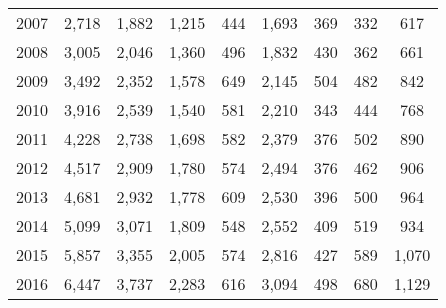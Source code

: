 \begin{table}[htbp]
\begin{tabular}{l*{8}{c}}
2007      &    2,718&    1,882&    1,215&      444&    1,693&      369&      332&      617\\
2008      &    3,005&    2,046&    1,360&      496&    1,832&      430&      362&      661\\
2009      &    3,492&    2,352&    1,578&      649&    2,145&      504&      482&      842\\
2010      &    3,916&    2,539&    1,540&      581&    2,210&      343&      444&      768\\
2011      &    4,228&    2,738&    1,698&      582&    2,379&      376&      502&      890\\
2012      &    4,517&    2,909&    1,780&      574&    2,494&      376&      462&      906\\
2013      &    4,681&    2,932&    1,778&      609&    2,530&      396&      500&      964\\
2014      &    5,099&    3,071&    1,809&      548&    2,552&      409&      519&      934\\
2015      &    5,857&    3,355&    2,005&      574&    2,816&      427&      589&    1,070\\
2016      &    6,447&    3,737&    2,283&      616&    3,094&      498&      680&    1,129\\
\hline\hline
\end{tabular}
\end{table}
